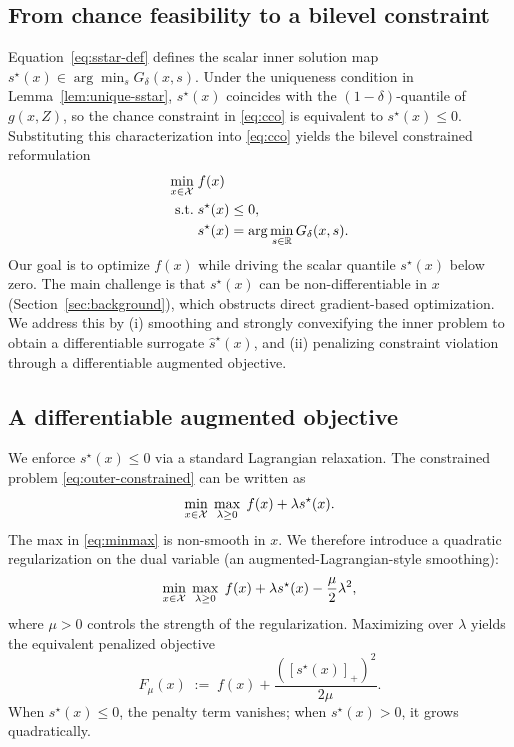 \documentclass{uai2026} %
\theoremstyle{plain}
\theoremstyle{definition}
\begin{document}
\subsection{From chance feasibility to a bilevel constraint}
Equation~\eqref{eq:sstar-def} defines the scalar inner solution map $s^\star(x)\in\arg\min_s G_\delta(x,s)$.
Under the uniqueness condition in Lemma~\ref{lem:unique-sstar}, $s^\star(x)$ coincides with the $(1-\delta)$-quantile of $g(x,Z)$, so the chance constraint in \eqref{eq:cco} is equivalent to $s^\star(x)\le 0$.
Substituting this characterization into \eqref{eq:cco} yields the bilevel constrained reformulation
\begin{equation}
  \begin{aligned}
    \min_{x\in\mathcal{X}}\; & f(x)\\
    \text{s.t.}\; & s^\star(x)\le 0,\\
    & s^\star(x)=\arg\min_{s\in\mathbb{R}} G_\delta(x,s).
  \end{aligned}\label{eq:outer-constrained}
\end{equation}
Our goal is to optimize $f(x)$ while driving the scalar quantile $s^\star(x)$ below zero.
The main challenge is that $s^\star(x)$ can be non-differentiable in $x$ (Section~\ref{sec:background}), which obstructs direct gradient-based optimization.
We address this by (i) smoothing and strongly convexifying the inner problem to obtain a differentiable surrogate $\widehat s^\star(x)$, and (ii) penalizing constraint violation through a differentiable augmented objective.

\subsection{A differentiable augmented objective}
We enforce $s^\star(x)\le 0$ via a standard Lagrangian relaxation. The constrained problem \eqref{eq:outer-constrained} can be written as
\begin{equation}
  \min_{x\in\mathcal{X}}\;\max_{\lambda\ge 0}\; f(x) + \lambda s^\star(x).\label{eq:minmax}
\end{equation}
The max in \eqref{eq:minmax} is non-smooth in $x$.
We therefore introduce a quadratic regularization on the dual variable (an augmented-Lagrangian-style smoothing):
\begin{equation}
  \min_{x\in\mathcal{X}}\;\max_{\lambda\ge 0}\; f(x) + \lambda s^\star(x) - \frac{\mu}{2}\lambda^2,\label{eq:aug-lag}
\end{equation}
where $\mu>0$ controls the strength of the regularization.
Maximizing over $\lambda$ yields the equivalent penalized objective
\begin{equation}
  F_\mu(x)\;:=\; f(x) + \frac{([s^\star(x)]_+)^2}{2\mu}.\label{eq:Fmu}
\end{equation}
When $s^\star(x)\le 0$, the penalty term vanishes; when $s^\star(x)>0$, it grows quadratically.
\end{document}
